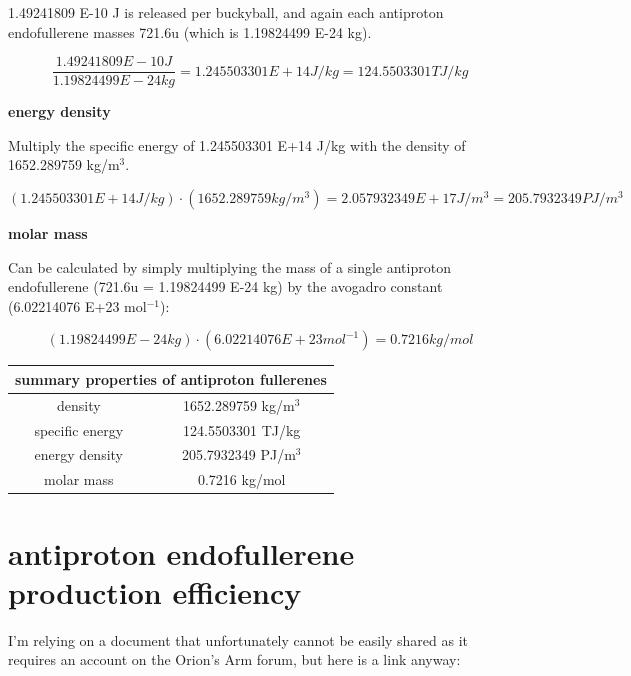 \documentclass[a4paper]{article}
\begin{document}
    1.49241809 E-10 J is released per buckyball, and again each antiproton endofullerene masses 721.6u (which is 1.19824499 E-24 kg).
    
    \medskip
    
    $$ \frac{1.49241809 E-10 J}{1.19824499 E-24 kg} = 1.245503301 E+14 J/kg = 124.5503301 TJ/kg $$
    
    \begin{center}
    	\textbf{energy density}
    \end{center}
    
    Multiply the specific energy of 1.245503301 E+14 J/kg with the density of 1652.289759 kg/m$^3$.
    
    \medskip
    
    $$ (1.245503301 E+14 J/kg) \cdot (1652.289759 kg/m^3) = 2.057932349 E+17 J/m^3 = 205.7932349 PJ/m^3 $$
    
    \begin{center}
    	\textbf{molar mass}
    \end{center}
    
    Can be calculated by simply multiplying the mass of a single antiproton endofullerene (721.6u = 1.19824499 E-24 kg) by the avogadro constant (6.02214076 E+23 mol$^{-1}$):
    
    $$ (1.19824499 E-24 kg) \cdot (6.02214076 E+23 mol^{-1}) = 0.7216 kg/mol $$
    
    \begin{center}
	    \begin{tabular}{| c | c |}
	    	\hline
	    	\multicolumn{2}{|c|}{\textbf{summary properties of antiproton fullerenes}} \\\hline
	    	density & 1652.289759 kg/m$^3$ \\\hline
	    	specific energy & 124.5503301 TJ/kg \\\hline
	    	energy density & 205.7932349 PJ/m$^3$ \\\hline
	    	molar mass & 0.7216 kg/mol \\\hline
	    \end{tabular}
    \end{center}
    
    \pagebreak
    
    \section{antiproton endofullerene production efficiency}
    
    I'm relying on a document that unfortunately cannot be easily shared as it requires an account on the Orion's Arm forum, but here is a link anyway: 
    
\end{document}
